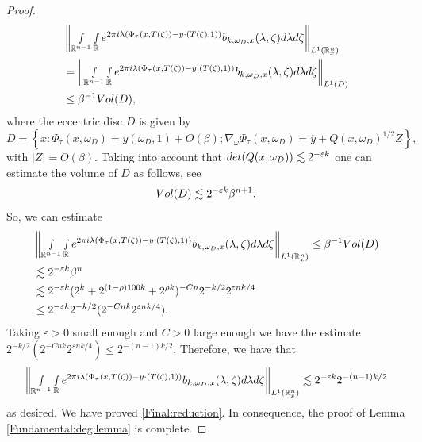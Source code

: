 \documentclass[12pt, reqno]{amsart}
\theoremstyle{definition}
\theoremstyle{remark}
\numberwithin{equation}{section}
\begin{document}
\begin{proof}
\begin{align*}
    & \left\Vert   \smallint\limits_{\mathbb{R}^{n-1}}  \smallint\limits_{\mathbb{R}} e^{2\pi i\lambda(\Phi_\tau(x,T(\zeta))-y\cdot (T(\zeta),1) ) } b_{k,\omega_D,x}(\lambda,\zeta)  d\lambda d\zeta \right\Vert_{L^1(\mathbb{R}^n_x)}\\
    &=  \left\Vert   \smallint\limits_{\mathbb{R}^{n-1}}  \smallint\limits_{\mathbb{R}} e^{2\pi i\lambda(\Phi_\tau(x,T(\zeta))-y\cdot (T(\zeta),1) ) } b_{k,\omega_D,x}(\lambda,\zeta)  d\lambda d\zeta \right\Vert_{L^1(D)}\\
    &\leq \beta^{-1}\textnormal{Vol}(D),
 \end{align*} where the eccentric disc $D$ is given by
$$ D=\left\{x: \Phi_\tau(x,\omega_D)=y(\omega_D,1)+O(\beta);\nabla_\omega \Phi_\tau(x,\omega_D)=\overline{y}+Q(x,\omega_D)^{1/2}Z \right\},$$ with $|Z|=O(\beta ) .$
Taking into account that $\textnormal{det}(Q(x,\omega_D))\lesssim 2^{-\varepsilon k}$ one can estimate the volume of $D$ as follows, see \cite[Page 8]{Tao} 
\begin{equation*}
    \textnormal{Vol}(D)\lesssim 2^{-\varepsilon k} \beta^{n+1}.
\end{equation*}So, we can estimate
\begin{align*}
     &\left\Vert   \smallint\limits_{\mathbb{R}^{n-1}}  \smallint\limits_{\mathbb{R}} e^{2\pi i\lambda(\Phi_\tau(x,T(\zeta))-y\cdot (T(\zeta),1) ) } b_{k,\omega_D,x}(\lambda,\zeta)  d\lambda d\zeta \right\Vert_{L^1(\mathbb{R}^n_x)}\leq \beta^{-1}\textnormal{Vol}(D)\\
     &\lesssim 2^{-\varepsilon k}\beta^{n}\\
     & \lesssim 2^{-\varepsilon k} (2^{ k}+2^{(1-\rho)100 k}+2^{\rho k})^{-Cn}2^{-k/2}2^{\varepsilon n k/4}\\
&\leq   2^{-\varepsilon k} 2^{-k/2}(2^{-Cn k}2^{\varepsilon n k/4}).
 \end{align*} Taking $\varepsilon>0$ small enough and $C>0$ large enough 
we have the estimate $2^{-k/2}(2^{-Cn k}2^{\varepsilon n k/4})\leq 2^{-(n-1)k/2}.$ Therefore, we have that
$$\left\Vert   \smallint\limits_{\mathbb{R}^{n-1}}  \smallint\limits_{\mathbb{R}} e^{2\pi i\lambda(\Phi_\tau(x,T(\zeta))-y\cdot (T(\zeta),1) ) } b_{k,\omega_D,x}(\lambda,\zeta)  d\lambda d\zeta \right\Vert_{L^1(\mathbb{R}^n_x)}\lesssim 2^{-\varepsilon k} 2^{-(n-1)k/2}$$
as desired. We have proved \eqref{Final:reduction}. In consequence, the proof of Lemma \ref{Fundamental:deg:lemma} is complete. 
\end{proof}
\end{document}
